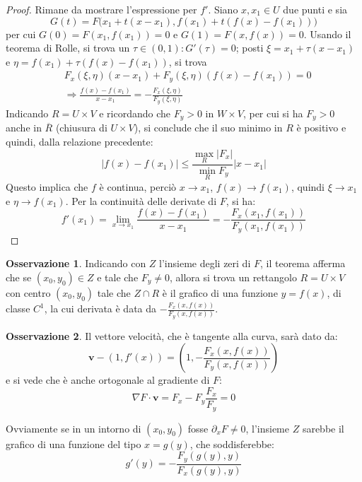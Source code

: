 \documentclass[11pt, a4paper]{scrartcl}
\theoremstyle{definition}
\numberwithin{esempio}{section}
\theoremstyle{definition}
\newtheorem{obs}{Osservazione}
\numberwithin{obs}{section}
\numberwithin{nota}{section}
\numberwithin{equation}{subsection}
\begin{document}
\begin{teorema}
\begin{proof}
Rimane da mostrare l'espressione per $f'$.
Siano $x,x_1 \in U$ due punti e sia
\[
G(t)  = F\big(x_1+t(x-x_1),f(x_1) +  t (f(x)-f(x_1))\big)
\] 
per cui $G(0) =  F(x_1,f(x_1))  = 0$ e $G(1) = F(x,f(x))=0$. 
Usando il teorema di Rolle, si trova un $\tau  \in (0,1) :  G'(\tau ) = 0 $; posti $\xi  = x_1 + \tau (x-x_1)$ e $\eta = f(x_1) + \tau (f(x) - f(x_1))$, si trova
\[
\begin{split}
	&F_x(\xi ,\eta) (x-x_1) + F_y(\xi ,\eta)(f(x)-f(x_1)) = 0\\
	&\Rightarrow \frac{f(x) -f(x_1)}{x-x_1} = - \frac{F_x(\xi ,\eta)}{F_y(\xi ,\eta)}
\end{split}
\] 
Indicando $R = U \times V$ e ricordando che $F_y > 0$ in $W\times V$, per cui si ha $F_y > 0$ anche in $\overline{R}$ (chiusura di $U \times V$), si conclude che il suo minimo in $R$ \`e positivo e quindi, dalla relazione precedente:
\[
\lvert f(x) - f(x_1) \rvert \le \frac{\max_R \lvert F_x \rvert }{\min_R F_y}\lvert x-x_1 \rvert 
\] 
Questo implica che $f$ \`e continua, perci\`o $x\to x_1$, $f(x) \to f(x_1)$, quindi $\xi  \to  x_1$ e $\eta \to f(x_1)$.
Per la continuit\`a delle derivate di $F$, si ha:
\[
f'(x_1) =  \lim_{x \to x_1} \frac{f(x) - f(x_1)}{x-x_1}= -  \frac{F_x(x_1,f(x_1))}{F_y(x_1,f(x_1))}
\] 

\end{proof}
\end{teorema}
\begin{obs}
	Indicando con $Z$ l'insieme degli zeri di $F$, il teorema afferma che se $(x_0,y_0) \in Z$ e tale che $F_y\neq 0$, allora si trova un rettangolo $R = U \times V$ con centro $(x_0,y_0)$ tale che $Z \cap R$ \`e il grafico di una funzione $y=f(x)$, di classe $C^1$, la cui derivata \`e data da $-\frac{F_x(x,f(x))}{F_y(x,f(x))}$.
\end{obs}
\begin{obs}
Il vettore velocit\`a, che \`e tangente alla curva, sar\`a dato da:
\begin{equation}
	\mathbf{v} - (1 , f'(x) ) = \left(1 , - \frac{F_x(x,f(x))}{F_y(x,f(x))}\right) 
\end{equation}
e si vede che \`e anche ortogonale al gradiente di $F$:
\[
	\nabla F \cdot \mathbf{v} = F_x - F_y \frac{F_x}{F_y}=0
\] 
\end{obs}
Ovviamente se in un intorno di $(x_0,y_0)$ fosse $\partial _x F \neq 0$, l'insieme $Z$ sarebbe il grafico di una funzione del tipo $x = g(y)$, che soddisferebbe:
\begin{equation}
	g'(y) = - \frac{F_y(g(y),y)}{F_x(g(y),y)}
\end{equation}
\end{document}
